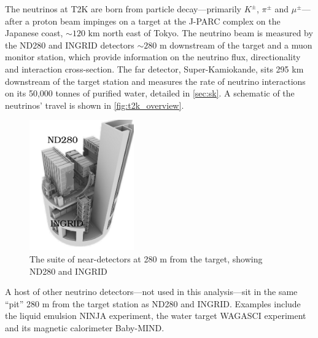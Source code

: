The neutrinos at T2K are born from particle decay---primarily $K^\pm$, $\pi^\pm$ and $\mu^\pm$---after a proton beam impinges on a target at the J-PARC complex on the Japanese coast, $\sim 120\text{ km}$ north east of Tokyo. The neutrino beam is measured by the ND280 and INGRID detectors $\sim280$ m downstream of the target and a muon monitor station, which provide information on the neutrino flux, directionality and interaction cross-section. The far detector, Super-Kamiokande, sits 295 km downstream of the target station and measures the rate of neutrino interactions on its 50,000 tonnes of purified water, detailed in \autoref{sec:sk}. A schematic of the neutrinos' travel is shown in \autoref{fig:t2k_overview}.
\begin{figure}[h]
	\includegraphics[width=0.4\textwidth, trim={10mm 0mm 0mm 0mm}, clip,page=1]{figures/det_chap/view/image_nd.jpeg}
	\caption{The suite of near-detectors at 280 m from the target, showing ND280 and INGRID}
\end{figure}

A host of other neutrino detectors---not used in this analysis---sit in the same ``pit'' 280 m from the target station as ND280 and INGRID. Examples include the liquid emulsion NINJA experiment\cite{ninja}, the water target WAGASCI\cite{wagasci} experiment and its magnetic calorimeter Baby-MIND\cite{baby_mind}.

